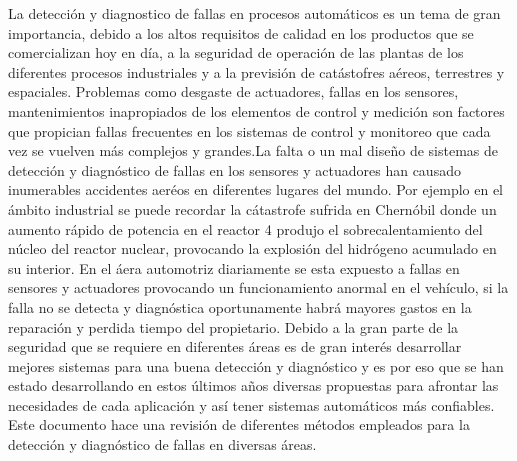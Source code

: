 


La detecci\'on y diagnostico de fallas en procesos autom\'aticos es un tema de gran importancia, debido a los altos requisitos de calidad en los productos  que se comercializan hoy en d\'ia, a la seguridad de operaci\'on de las plantas de los diferentes procesos industriales y a la previsi\'on de cat\'astofres a\'ereos, terrestres y espaciales.
Problemas como desgaste de actuadores, fallas en los sensores, mantenimientos inapropiados de los elementos de control y medición son factores que propician fallas frecuentes en los sistemas de control y monitoreo que cada vez se vuelven m\'as  complejos y grandes.La
falta o un mal dise\~no de sistemas de detecci\'on y diagn\'ostico de fallas en los sensores y actuadores han causado inumerables accidentes aer\'eos en diferentes lugares del mundo. Por ejemplo en el \'ambito industrial se puede recordar la c\'atastrofe sufrida en Chern\'obil donde un aumento r\'apido  de potencia en el reactor 4 produjo el sobrecalentamiento del n\'ucleo del reactor nuclear, provocando la explosi\'on del hidr\'ogeno acumulado en su interior. En el \'aera automotriz  diariamente se esta expuesto a fallas en sensores y actuadores provocando un funcionamiento anormal en el veh\'iculo, si la falla no se detecta y diagn\'ostica oportunamente habr\'a mayores gastos en la reparaci\'on  y perdida tiempo del propietario.
Debido a la gran parte de la seguridad que se requiere en diferentes \'areas es de gran inter\'es desarrollar mejores sistemas para una buena detección y diagn\'ostico y es por eso que se han estado desarrollando en estos \'ultimos años diversas propuestas para afrontar las necesidades de cada aplicaci\'on y as\'i tener sistemas autom\'aticos m\'as confiables.
Este documento hace una revisi\'on de diferentes m\'etodos empleados para la detecci\'on y diagn\'ostico de fallas en diversas \'areas.

